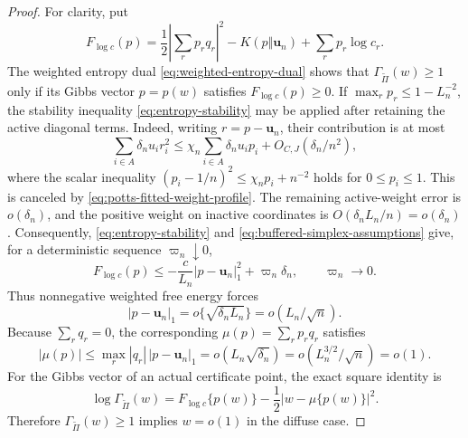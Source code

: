 \begin{proof}
For clarity, put
\[
 F_{\log c}(p)
 =\frac12\left|\sum_rp_rq_r\right|^2
  -K(p\Vert\mathbf u_n)+\sum_rp_r\log c_r.
\]
The weighted entropy dual \eqref{eq:weighted-entropy-dual} shows that
\(\Gamma_{\widetilde\Pi}(w)\ge1\) only if its Gibbs vector \(p=p(w)\)
satisfies \(F_{\log c}(p)\ge0\).  If
\(\max_rp_r\le1-L_n^{-2}\), the stability inequality
\eqref{eq:entropy-stability} may be applied after retaining the active
diagonal terms.  Indeed, writing \(r=p-\mathbf u_n\), their contribution is at
most
\[
 \sum_{i\in A}\delta_nu_i r_i^2
 \le\chi_n\sum_{i\in A}\delta_nu_i p_i+O_{C,J}(\delta_n/n^2),
\]
where the scalar inequality
\((p_i-1/n)^2\le\chi_np_i+n^{-2}\) holds for \(0\le p_i\le1\).
This is canceled by \eqref{eq:potts-fitted-weight-profile}.  The remaining
active-weight error is \(o(\delta_n)\), and the positive weight on
inactive coordinates is \(O(\delta_nL_n/n)=o(\delta_n)\).  Consequently,
\eqref{eq:entropy-stability} and
\eqref{eq:buffered-simplex-assumptions} give, for a deterministic sequence
\(\varpi_n\downarrow0\),
\[
 F_{\log c}(p)
 \le
 -\frac{c}{L_n}|p-\mathbf u_n|_1^2+\varpi_n\delta_n,
 \qquad \varpi_n\longrightarrow0.
\]
Thus nonnegative weighted free energy forces
\[
 |p-\mathbf u_n|_1=o\{\sqrt{\delta_nL_n}\}
 =o(L_n/\sqrt n).
\]
Because \(\sum_rq_r=0\), the corresponding
\(\mu(p)=\sum_rp_rq_r\) satisfies
\[
 |\mu(p)|
 \le \max_r|q_r|\,|p-\mathbf u_n|_1
 =o(L_n\sqrt{\delta_n})
 =o(L_n^{3/2}/\sqrt n)=o(1).
\]
For the Gibbs vector of an actual certificate point, the exact square
identity is
\begin{equation}
\label{eq:weighted-certificate-square-identity}
 \log\Gamma_{\widetilde\Pi}(w)
 =F_{\log c}\{p(w)\}-\frac12|w-\mu\{p(w)\}|^2.
\end{equation}
Therefore \(\Gamma_{\widetilde\Pi}(w)\ge1\) implies \(w=o(1)\) in the
diffuse case.


\end{proof}
